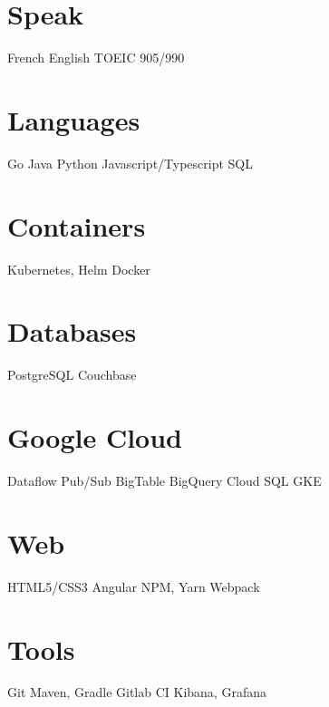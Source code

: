\documentclass[hidelinks]{cv-style}          %
\begin{document}
\poste{}

\begin{aside}
\section{Speak}
French
English
TOEIC 905/990
%
\section{Languages}
Go
Java
Python
Javascript/Typescript
SQL
\section{Containers}
Kubernetes, Helm
Docker
\section{Databases}
PostgreSQL
Couchbase
\section{Google Cloud}
Dataflow
Pub/Sub
BigTable
BigQuery
Cloud SQL
GKE
\section{Web}
HTML5/CSS3
Angular
NPM, Yarn
Webpack
\section{Tools}
Git
Maven, Gradle
Gitlab CI
Kibana, Grafana
%
\end{aside}






\end{document}
